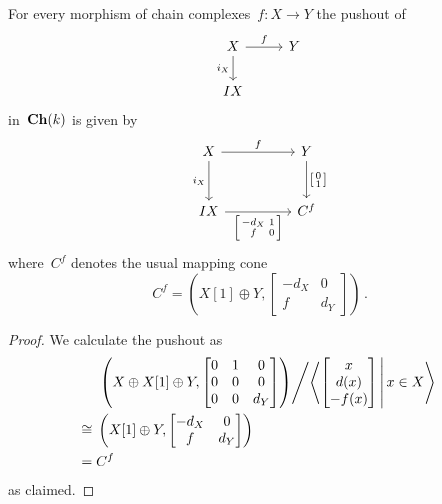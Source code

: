\documentclass[a4paper,10pt]{scrartcl}
\begin{document}
\begin{lemma}
  For every morphism of chain complexes~$f \colon X \to Y$ the pushout of
  \[
    \begin{tikzcd}
      X
      \arrow{r}[above]{f}
      \arrow{d}[left]{i_X}
      &
      Y
      \\
      IX
      &
      {}
    \end{tikzcd}
  \]
  in~$\mathbf{Ch}(k)$ is given by
  \[
    \begin{tikzcd}[ampersand replacement = \&, row sep = large, column sep = huge]
      X
      \arrow{r}[above]{f}
      \arrow{d}[left]{i_X}
      \&
      Y
      \arrow{d}[right]{\begin{bsmallmatrix} 0 \\ 1 \end{bsmallmatrix}}
      \\
      IX
      \arrow{r}[below]{\begin{bsmallmatrix} -d_X & 1 \\ f & 0 \end{bsmallmatrix}}
      \&
      C^f
    \end{tikzcd}
  \]
  where~$C^f$ denotes the usual mapping cone
  \[
    C^f
    =
    \left(
    X[1] \oplus Y,
    \begin{bmatrix}
      -d_X & 0   \\
       f   & d_Y
    \end{bmatrix}
  \right) \,.
  \]
\end{lemma}

\begin{proof}
  We calculate the pushout as
  \begin{align*}
    {}&
    \left.
    \left(
      X \oplus X[1] \oplus Y,
      \begin{bmatrix}
        0 & 1 & 0   \\
        0 & 0 & 0   \\
        0 & 0 & d_Y
      \end{bmatrix}
    \right)
    \middle/
    \gen*{
      \begin{bmatrix}
           x  \\
         d(x) \\
        -f(x)
      \end{bmatrix}
    \suchthat*
      x \in X
    }
    \right.
    \\
    \cong{}&
    \left(
      X[1] \oplus Y,
      \begin{bmatrix}
        -d_X & 0   \\
         f   & d_Y
      \end{bmatrix}
    \right)
    \\
    ={}&
    C^f
  \end{align*}
  as claimed.
\end{proof}
\end{document}
